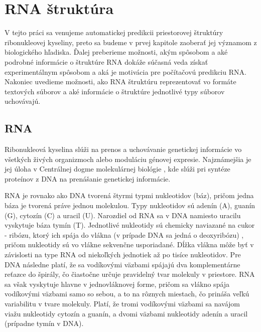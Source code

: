 

\chapter{RNA štruktúra}
V tejto práci sa venujeme automatickej predikcii priestorovej štruktúry ribonukleovej kyseliny, 
preto sa budeme v prvej kapitole zaoberať jej významom z biologického hľadiska. 
Ďalej preberieme možnosti, akým spôsobom a aké podrobné informácie o štruktúre RNA dokáže súčasná veda získať experimentálnym spôsobom a aká je motivácia pre počítačovú predikciu RNA.   
Nakoniec uvedieme možnosti, ako RNA štruktúru reprezentovať vo formáte textových súborov a aké informácie o štruktúre jednotlivé typy súborov uchovávajú. 

\section{RNA}
Ribonukleová kyselina slúži na prenos a uchovávanie genetickej informácie vo všetkých živých organizmoch alebo moduláciu génovej expresie. Najznámejšia je jej úloha v Centrálnej dogme molekulárnej biológie \cite{Crick70}, kde slúži pri syntéze proteínov z DNA na prenášanie genetickej informácie.


\indent RNA je rovnako ako DNA tvorená štyrmi typmi nukleotidov (báz), pričom jedna báza je tvorená práve jednou molekulou. Typy nukleotidov sú adenín (A), guanín (G), cytozín (C) a uracil (U).  Narozdiel od RNA sa v DNA namiesto uracilu vyskytuje báza tymín (T). Jednotlivé nukleotidy sú chemicky naviazané na cukor - ribózu, ktorý ich spája do vlákna (v prípade DNA sa jedná o deoxyribózu) , pričom nukleotidy sú vo vlákne sekvenčne usporiadané. 
Dĺžka vlákna môže byť v závislosti na type RNA od niekoľkých jednotiek až po tisíce nukleotidov.  Pre DNA následne platí, že sa vodíkovými väzbami spájajú dva komplementárne reťazce do špirály, čo čiastočne určuje pravidelný tvar molekuly v priestore. RNA sa však vyskytuje hlavne v  jednovláknovej forme, pričom sa vlákno spája vodíkovými väzbami samo so sebou, a to na rôznych miestach, čo prináša veľkú variabilitu v tvare molekuly. Platí, že tromi vodíkovými väzbami sa navájom viažu nukleotidy cytozín a guanín, a dvomi väzbami nukleotidy adenín a uracil (prípadne tymín v DNA).

